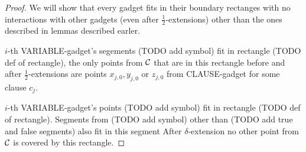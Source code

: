\begin{proof}
We will show that every gadget fits in their boundary rectanges
with no interactions
with other gadgets (even after $\frac{1}{2}$-extensions)
other than the ones described in lemmas described earler.

$i$-th VARIABLE-gadget's segements (TODO add symbol) fit in rectangle 
(TODO def of rectangle),
the only points from $\mathcal{C}$ that are in this rectangle
before and after $\frac{1}{2}$-extensions are
points $x_{j,0}, y_{j,0}$ or $z_{j,0}$ 
from CLAUSE-gadget for some clause $c_j$.

$i$-th VARIABLE-gadget's points (TODO add symbol) fit in rectangle
(TODO def of rectangle). 
Segments from (TODO add symbol) other than (TODO add true and false segments)
also fit in this segment
After $\delta$-extension no other
point from $\mathcal{C}$ is covered by this rectangle.

\end{proof}

